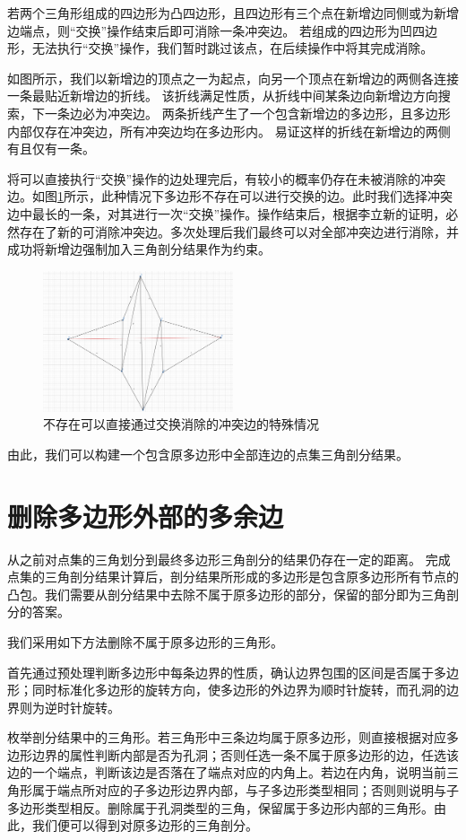 若两个三角形组成的四边形为凸四边形，且四边形有三个点在新增边同侧或为新增边端点，则“交换”操作结束后即可消除一条冲突边。
若组成的四边形为凹四边形，无法执行“交换”操作，我们暂时跳过该点，在后续操作中将其完成消除。

如图所示，我们以新增边的顶点之一为起点，向另一个顶点在新增边的两侧各连接一条最贴近新增边的折线。
该折线满足性质，从折线中间某条边向新增边方向搜索，下一条边必为冲突边。
两条折线产生了一个包含新增边的多边形，且多边形内部仅存在冲突边，所有冲突边均在多边形内。
易证这样的折线在新增边的两侧有且仅有一条。

将可以直接执行“交换”操作的边处理完后，有较小的概率仍存在未被消除的冲突边。如图\ref*{deadlock}所示，此种情况下多边形不存在可以进行交换的边。此时我们选择冲突边中最长的一条，对其进行一次“交换”操作。操作结束后，根据李立新的证明，必然存在了新的可消除冲突边。多次处理后我们最终可以对全部冲突边进行消除，并成功将新增边强制加入三角剖分结果作为约束。

\begin{figure}[htp]
    \centering
    \includegraphics[width=0.5\textwidth]
    {figures/deadlock.png}
    \caption{不存在可以直接通过交换消除的冲突边的特殊情况}
    \label{deadlock}
  \end{figure}

由此，我们可以构建一个包含原多边形中全部连边的点集三角剖分结果。

\section{删除多边形外部的多余边}

从之前对点集的三角划分到最终多边形三角剖分的结果仍存在一定的距离。
完成点集的三角剖分结果计算后，剖分结果所形成的多边形是包含原多边形所有节点的凸包。我们需要从剖分结果中去除不属于原多边形的部分，保留的部分即为三角剖分的答案。

我们采用如下方法删除不属于原多边形的三角形。

首先通过预处理判断多边形中每条边界的性质，确认边界包围的区间是否属于多边形；同时标准化多边形的旋转方向，使多边形的外边界为顺时针旋转，而孔洞的边界则为逆时针旋转。

枚举剖分结果中的三角形。若三角形中三条边均属于原多边形，则直接根据对应多边形边界的属性判断内部是否为孔洞；否则任选一条不属于原多边形的边，任选该边的一个端点，判断该边是否落在了端点对应的内角上。若边在内角，说明当前三角形属于端点所对应的子多边形边界内部，与子多边形类型相同；否则则说明与子多边形类型相反。删除属于孔洞类型的三角，保留属于多边形内部的三角形。由此，我们便可以得到对原多边形的三角剖分。